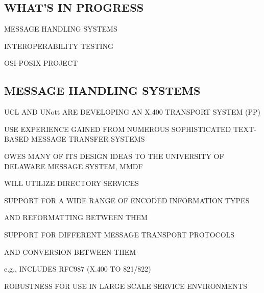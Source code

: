 \begin{bwslide}
\part	{WHAT'S IN PROGRESS}\bf

\begin{nrtc}
\item	MESSAGE HANDLING SYSTEMS

\item	INTEROPERABILITY TESTING

\item	OSI-POSIX PROJECT
\end{nrtc}
\end{bwslide}


\begin{bwslide}
\part*	{MESSAGE HANDLING SYSTEMS}

\begin{nrtc}
\item	UCL AND UNott ARE DEVELOPING AN X.400 TRANSPORT SYSTEM (PP)

\item	USE EXPERIENCE GAINED FROM NUMEROUS SOPHISTICATED TEXT-BASED MESSAGE
	TRANSFER SYSTEMS

\item	OWES MANY OF ITS DESIGN IDEAS TO THE UNIVERSITY OF DELAWARE MESSAGE
	SYSTEM, MMDF

\item	WILL UTILIZE DIRECTORY SERVICES
\end{nrtc}
\end{bwslide}




\begin{bwslide}

\begin{nrtc}
\item	SUPPORT FOR A WIDE RANGE OF ENCODED INFORMATION TYPES 
    \begin{nrtc}
    \item	AND REFORMATTING BETWEEN THEM
    \end{nrtc}

\item	SUPPORT FOR DIFFERENT MESSAGE TRANSPORT PROTOCOLS
    \begin{nrtc}
    \item	AND CONVERSION BETWEEN THEM
    \end{nrtc}
    e.g., INCLUDES RFC987 (X.400 TO 821/822)

\item	ROBUSTNESS FOR USE IN LARGE SCALE SERVICE ENVIRONMENTS
\end{nrtc}
\end{bwslide}


